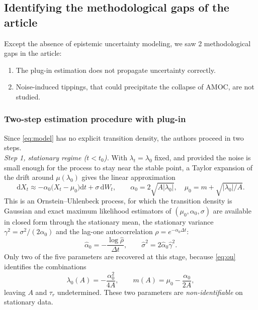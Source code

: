 \documentclass[12pt,a4paper]{article}
\theoremstyle{definition}
\theoremstyle{plain}
\newcommand{\dd}{\mathrm{d}}
\begin{document}
\subsection{Identifying the methodological gaps of the article}

\label{sec:id_AMOC} %

Except the absence of epistemic uncertainty modeling, we saw 2 methodological gaps in the article: 
\begin{enumerate}
    \item The plug-in estimation does not propagate uncertainty correctly.
    \item Noise-induced tippings, that could precipitate the collapse of AMOC, are not studied. \\
\end{enumerate}


\subsubsection{Two-step estimation procedure with plug-in}

Since \eqref{eq:model} has no explicit transition density, the authors proceed in two steps. \\

\noindent \emph{Step 1, stationary regime ($t<t_0$).} With $\lambda_t = \lambda_0$ fixed, and provided
the noise is small enough for the process to stay near the stable point, a Taylor expansion of
the drift around $\mu(\lambda_0)$ gives the linear approximation
\begin{equation}
\label{eq:ou}
\dd X_t\approx-\alpha_0\big(X_t-\mu_0\big)\dd t+\sigma\,\dd W_t,
\qquad \alpha_0=2\sqrt{A|\lambda_0|},\quad \mu_0=m+\sqrt{|\lambda_0|/A} .
\end{equation}
This is an Ornstein--Uhlenbeck process, for which the transition density is Gaussian and exact
maximum likelihood estimators of $(\mu_0,\alpha_0,\sigma)$ are available in closed form
through the stationary mean, the stationary variance $\gamma^2=\sigma^2/(2\alpha_0)$ and the
lag-one autocorrelation $\rho=e^{-\alpha_0\Delta t}$:
\begin{equation}
\label{eq:ou_est}
\hat\alpha_0=-\frac{\log\hat\rho}{\Delta t},\qquad \hat\sigma^2=2\hat\alpha_0\hat\gamma^2 .
\end{equation}
Only two of the five parameters are recovered at this stage, because
\eqref{eq:ou} identifies the combinations
\begin{equation}
\label{eq:link}
\lambda_0(A)=-\frac{\alpha_0^2}{4A},\qquad m(A)=\mu_0-\frac{\alpha_0}{2A},
\end{equation}
leaving $A$ and $\tau_r$ undetermined. These two parameters are \emph{non-identifiable} on stationary data. \\ 
\end{document}
